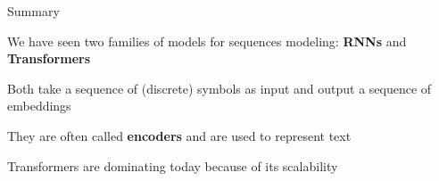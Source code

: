 \documentclass[usenames,dvipsnames,notes,11pt,aspectratio=169,hyperref={colorlinks=true, linkcolor=blue}]{beamer}
\begin{document}
\begin{frame}
    {Summary}
    \begin{wideitemize}
        \item We have seen two families of models for sequences modeling: \textbf{RNNs} and \textbf{Transformers}
        \item Both take a sequence of (discrete) symbols as input and output a sequence of embeddings
        \item They are often called \textbf{encoders} and are used to represent text
        \item Transformers are dominating today because of its scalability
    \end{wideitemize}
\end{frame}
\end{document}
